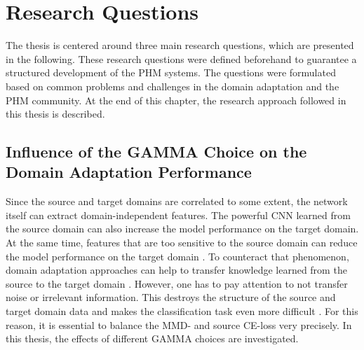 \chapter{Research Questions}\label{chapter:research_approach}
The thesis is centered around three main research questions, which are presented in the following. These research questions were defined beforehand to guarantee a structured development of the PHM systems. The questions were formulated based on common problems and challenges in the domain adaptation and the PHM community. At the end of this chapter, the research approach followed in this thesis is described.

\section{Influence of the GAMMA Choice on the Domain Adaptation Performance}
Since the source and target domains are correlated to some extent, the network itself can extract domain-independent features. The powerful CNN learned from the source domain can also increase the model performance on the target domain. At the same time, features that are too sensitive to the source domain can reduce the model performance on the target domain \cite{li2020}. To counteract that phenomenon, domain adaptation approaches can help to transfer knowledge learned from the source to the target domain \cite{li2020}. However, one has to pay attention to not transfer noise or irrelevant information. This destroys the structure of the source and target domain data and makes the classification task even more difficult \cite{li2020}. For this reason, it is essential to balance the MMD- and source CE-loss very precisely. In this thesis, the effects of different GAMMA choices are investigated.

